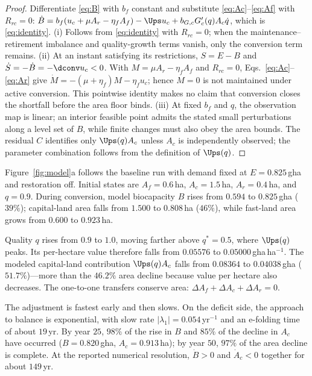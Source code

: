 \begin{proof}
Differentiate \eqref{eq:B} with $b_f$ constant and substitute \eqref{eq:Ac}--\eqref{eq:Af} with $R_{rc}=0$: $\dot B=b_f(u_c+\mu A_r-\eta_fA_f)-\Ups u_c+b_{G,c}G_c'(q)A_c\dot q$, which is \eqref{eq:identity}. (i) Follows from \eqref{eq:identity} with $R_{rc}=0$; when the maintenance--retirement imbalance and quality-growth terms vanish, only the conversion term remains. (ii) At an instant satisfying its restrictions, $S=E-B$ and $\dot S=-\dot B=-\dconv u_c<0$. With $M=\mu A_r-\eta_fA_f$ and $R_{rc}=0$, Eqs.~\eqref{eq:Ac}--\eqref{eq:Ar} give $\dot M=-(\mu+\eta_f)M-\eta_fu_c$; hence $M=0$ is not maintained under active conversion. This pointwise identity makes no claim that conversion closes the shortfall before the area floor binds. (iii) At fixed $b_f$ and $q$, the observation map is linear; an interior feasible point admits the stated small perturbations along a level set of $B$, while finite changes must also obey the area bounds. The residual $C$ identifies only $\Ups(q)A_c$ unless $A_c$ is independently observed; the parameter combination follows from the definition of $\Ups(q)$.
\end{proof}

Figure~\ref{fig:model}a follows the baseline run with demand fixed at $E=0.825$\,gha and restoration off. Initial states are $A_f=0.6$\,ha, $A_c=1.5$\,ha, $A_r=0.4$\,ha, and $q=0.9$. During conversion, model biocapacity $B$ rises from $0.594$ to $0.825$\,gha ($39\%$); capital-land area falls from $1.500$ to $0.808$\,ha ($46\%$), while fast-land area grows from $0.600$ to $0.923$\,ha.

Quality $q$ rises from $0.9$ to $1.0$, moving farther above $q^*=0.5$, where $\Ups(q)$ peaks. Its per-hectare value therefore falls from $0.05576$ to $0.05000$\,gha\,ha$^{-1}$. The modeled capital-land contribution $\Ups(q)A_c$ falls from $0.08364$ to $0.04038$\,gha ($51.7\%$)—more than the $46.2\%$ area decline because value per hectare also decreases. The one-to-one transfers conserve area: $\Delta A_f+\Delta A_c+\Delta A_r=0$.

The adjustment is fastest early and then slows. On the deficit side, the approach to balance is exponential, with slow rate $|\lambda_1|=0.054$\,yr$^{-1}$ and an e-folding time of about $19$\,yr. By year $25$, $98\%$ of the rise in $B$ and $85\%$ of the decline in $A_c$ have occurred ($B=0.820$\,gha, $A_c=0.913$\,ha); by year $50$, $97\%$ of the area decline is complete. At the reported numerical resolution, $\dot B>0$ and $\dot A_c<0$ together for about $149$\,yr.

